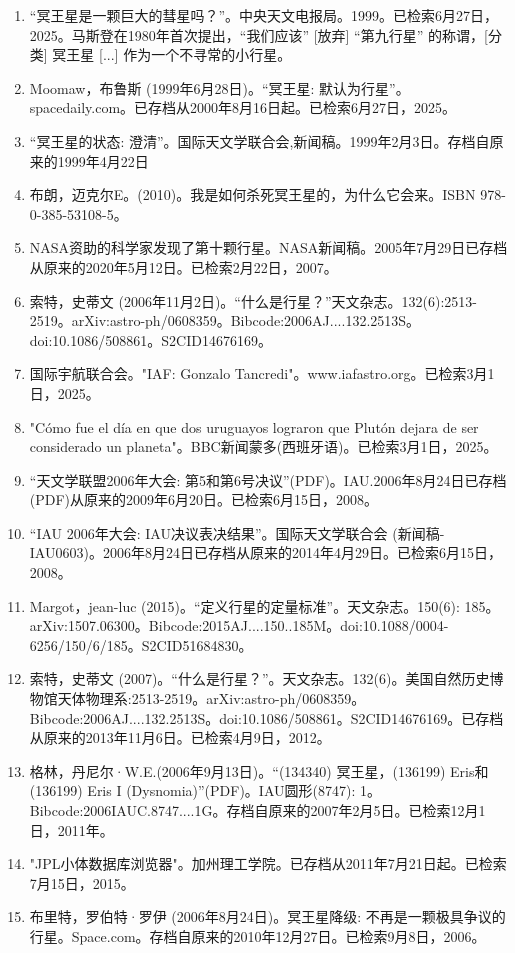\begin{enumerate}
\item “冥王星是一颗巨大的彗星吗？”。中央天文电报局。1999。已检索6月27日，2025。马斯登在1980年首次提出，“我们应该” [放弃] “第九行星” 的称谓，[分类] 冥王星 [...] 作为一个不寻常的小行星。
\item Moomaw，布鲁斯 (1999年6月28日)。“冥王星: 默认为行星”。spacedaily.com。已存档从2000年8月16日起。已检索6月27日，2025。
\item “冥王星的状态: 澄清”。国际天文学联合会,新闻稿。1999年2月3日。存档自原来的1999年4月22日
\item 布朗，迈克尔E。(2010)。我是如何杀死冥王星的，为什么它会来。ISBN 978-0-385-53108-5。
\item NASA资助的科学家发现了第十颗行星。NASA新闻稿。2005年7月29日已存档从原来的2020年5月12日。已检索2月22日，2007。
\item 索特，史蒂文 (2006年11月2日)。“什么是行星？”天文杂志。132(6):2513-2519。arXiv:astro-ph/0608359。Bibcode:2006AJ....132.2513S。doi:10.1086/508861。S2CID14676169。 
\item 国际宇航联合会。"IAF: Gonzalo Tancredi"。www.iafastro.org。已检索3月1日，2025。
\item "Cómo fue el día en que dos uruguayos lograron que Plutón dejara de ser considerado un planeta"。BBC新闻蒙多(西班牙语)。已检索3月1日，2025。
\item “天文学联盟2006年大会: 第5和第6号决议”(PDF)。IAU.2006年8月24日已存档(PDF)从原来的2009年6月20日。已检索6月15日，2008。
\item “IAU 2006年大会: IAU决议表决结果”。国际天文学联合会 (新闻稿-IAU0603)。2006年8月24日已存档从原来的2014年4月29日。已检索6月15日，2008。
\item Margot，jean-luc (2015)。“定义行星的定量标准”。天文杂志。150(6): 185。arXiv:1507.06300。Bibcode:2015AJ....150..185M。doi:10.1088/0004-6256/150/6/185。S2CID51684830。 
\item 索特，史蒂文 (2007)。“什么是行星？”。天文杂志。132(6)。美国自然历史博物馆天体物理系:2513-2519。arXiv:astro-ph/0608359。Bibcode:2006AJ....132.2513S。doi:10.1086/508861。S2CID14676169。已存档从原来的2013年11月6日。已检索4月9日，2012。 
\item 格林，丹尼尔·W.E.(2006年9月13日)。“(134340) 冥王星，(136199) Eris和 (136199) Eris I (Dysnomia)”(PDF)。IAU圆形(8747): 1。Bibcode:2006IAUC.8747....1G。存档自原来的2007年2月5日。已检索12月1日，2011年。
\item "JPL小体数据库浏览器"。加州理工学院。已存档从2011年7月21日起。已检索7月15日，2015。
\item 布里特，罗伯特·罗伊 (2006年8月24日)。冥王星降级: 不再是一颗极具争议的行星。Space.com。存档自原来的2010年12月27日。已检索9月8日，2006。

\end{enumerate}
